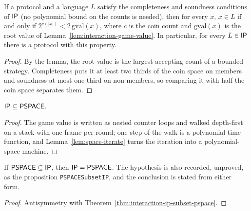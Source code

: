 \begin{theorem}
  \label{thm:interaction-ip-game-value}
  \leanok
  If a protocol and a language $L$ satisfy the completeness and soundness
  conditions of $\mathsf{IP}$ (no polynomial bound on the counts is needed), then
  for every $x$, $x \in L$ if and only if $2^{c(|x|)} < 2\,\mathrm{gval}(x)$,
  where $c$ is the coin count and $\mathrm{gval}(x)$ is the root value of
  Lemma~\ref{lem:interaction-game-value}. In particular, for every
  $L \in \mathsf{IP}$ there is a protocol with this property.
\end{theorem}
\begin{proof}
  \leanok
  By the lemma, the root value is the largest accepting count of a bounded
  strategy. Completeness puts it at least two thirds of the coin space on
  members and soundness at most one third on non-members, so comparing it
  with half the coin space separates them.
\end{proof}

\begin{theorem}
  \label{thm:interaction-ip-subset-pspace}
  \leanok
  $\mathsf{IP} \subseteq \mathsf{PSPACE}$.
\end{theorem}
\begin{proof}
  \leanok
  The game value is written as nested counter loops and walked depth-first on
  a stack with one frame per round; one step of the walk is a polynomial-time
  function, and Lemma~\ref{lem:space-iterate} turns the iteration into a
  polynomial-space machine.
\end{proof}

\begin{proposition}[IP = PSPACE, given the hard half]
  \label{prop:interaction-ip-eq-pspace-of}
  \leanok
  If $\mathsf{PSPACE} \subseteq \mathsf{IP}$, then $\mathsf{IP} = \mathsf{PSPACE}$. The
  hypothesis is also recorded, unproved, as the proposition
  \texttt{PSPACESubsetIP}, and the conclusion is stated from either form.
\end{proposition}
\begin{proof}
  \leanok
  Antisymmetry with Theorem~\ref{thm:interaction-ip-subset-pspace}.
\end{proof}

